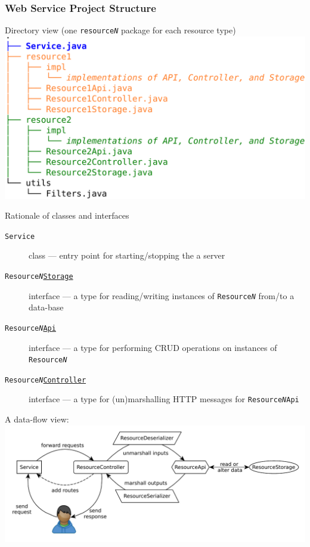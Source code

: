 \documentclass[presentation]{beamer}\mode<presentation>{\usetheme{AMSBolognaFC}}
\begin{document}
\begin{frame}[allowframebreaks]\frametitle{Web Service Project Structure}
    \begin{block}{Directory view (one \texttt{resource\textit{N}} package for each resource type)}\centering
        \includegraphics[width=.8\linewidth]{./figures/ws-structure.pdf}
    \end{block}

    \begin{block}{Rationale of classes and interfaces}
        \begin{description}
            \item[\texttt{Service}] class --- entry point for starting/stopping the a server
            \item[\texttt{Resource\textit{N}\underline{Storage}}] interface --- a type for reading/writing instances of \texttt{Resource\textit{N}} from/to a data-base
            \item[\texttt{Resource\textit{N}\underline{Api}}] interface --- a type for performing CRUD operations on instances of \texttt{Resource\textit{N}}
            \item[\texttt{Resource\textit{N}\underline{Controller}}] interface --- a type for (un)marshalling HTTP messages for \texttt{Resource\textit{N}Api}
        \end{description}
    \end{block}

    \framebreak

    A data-flow view:
    \includegraphics[width=\linewidth]{figures/data-flow.pdf}


\end{frame}
\end{document}
